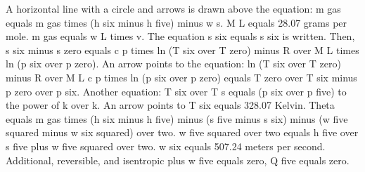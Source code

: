 A horizontal line with a circle and arrows is drawn above the equation: 
m gas equals m gas times (h six minus h five) minus w s.
M L equals 28.07 grams per mole.
m gas equals w L times v.
The equation s six equals s six is written. Then, s six minus s zero equals c p times ln (T six over T zero) minus R over M L times ln (p six over p zero).
An arrow points to the equation: 
ln (T six over T zero) minus R over M L c p times ln (p six over p zero) equals T zero over T six minus p zero over p six.
Another equation: 
T six over T s equals (p six over p five) to the power of k over k.
An arrow points to T six equals 328.07 Kelvin.
Theta equals m gas times (h six minus h five) minus (s five minus s six) minus (w five squared minus w six squared) over two.
w five squared over two equals h five over s five plus w five squared over two.
w six equals 507.24 meters per second.
Additional, reversible, and isentropic plus w five equals zero, Q five equals zero.